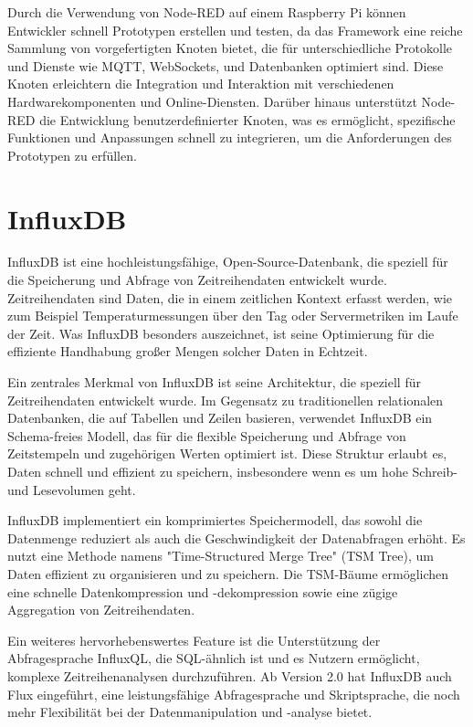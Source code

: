 \documentclass[oneside]{ausarbeitung}
\begin{document}
Durch die Verwendung von Node-RED auf einem Raspberry Pi können Entwickler schnell Prototypen erstellen und testen, da das Framework eine reiche Sammlung von vorgefertigten Knoten bietet, die für unterschiedliche Protokolle und Dienste wie MQTT, WebSockets, und Datenbanken optimiert sind. Diese Knoten erleichtern die Integration und Interaktion mit verschiedenen Hardwarekomponenten und Online-Diensten. Darüber hinaus unterstützt Node-RED die Entwicklung benutzerdefinierter Knoten, was es ermöglicht, spezifische Funktionen und Anpassungen schnell zu integrieren, um die Anforderungen des Prototypen zu erfüllen.

\section{InfluxDB}
\label{sec:foundations_influxdb}

InfluxDB ist eine hochleistungsfähige, Open-Source-Datenbank, die speziell für die Speicherung und Abfrage von Zeitreihendaten entwickelt wurde. Zeitreihendaten sind Daten, die in einem zeitlichen Kontext erfasst werden, wie zum Beispiel Temperaturmessungen über den Tag oder Servermetriken im Laufe der Zeit. Was InfluxDB besonders auszeichnet, ist seine Optimierung für die effiziente Handhabung großer Mengen solcher Daten in Echtzeit.

Ein zentrales Merkmal von InfluxDB ist seine Architektur, die speziell für Zeitreihendaten entwickelt wurde. Im Gegensatz zu traditionellen relationalen Datenbanken, die auf Tabellen und Zeilen basieren, verwendet InfluxDB ein Schema-freies Modell, das für die flexible Speicherung und Abfrage von Zeitstempeln und zugehörigen Werten optimiert ist. Diese Struktur erlaubt es, Daten schnell und effizient zu speichern, insbesondere wenn es um hohe Schreib- und Lesevolumen geht.

InfluxDB implementiert ein komprimiertes Speichermodell, das sowohl die Datenmenge reduziert als auch die Geschwindigkeit der Datenabfragen erhöht. Es nutzt eine Methode namens "Time-Structured Merge Tree" (TSM Tree), um Daten effizient zu organisieren und zu speichern. Die TSM-Bäume ermöglichen eine schnelle Datenkompression und -dekompression sowie eine zügige Aggregation von Zeitreihendaten.

Ein weiteres hervorhebenswertes Feature ist die Unterstützung der Abfragesprache InfluxQL, die SQL-ähnlich ist und es Nutzern ermöglicht, komplexe Zeitreihenanalysen durchzuführen. Ab Version 2.0 hat InfluxDB auch Flux eingeführt, eine leistungsfähige Abfragesprache und Skriptsprache, die noch mehr Flexibilität bei der Datenmanipulation und -analyse bietet.
\end{document}

